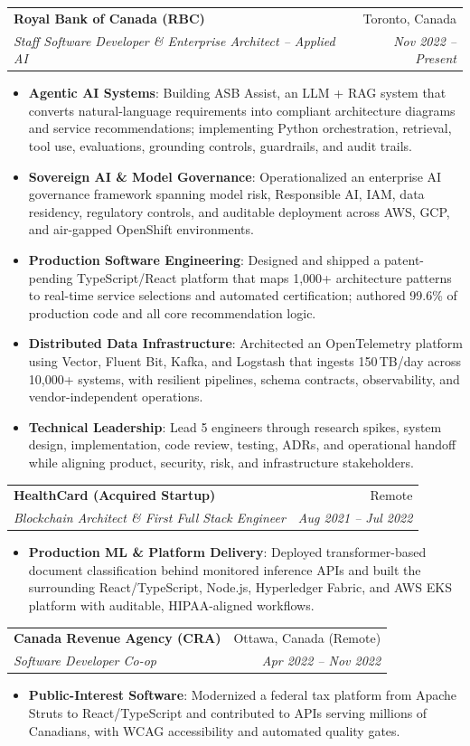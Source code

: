 \documentclass[letterpaper,9.5pt]{article}
\makeatletter
\newcommand{\resumeItem}[2]{\item\small{\textbf{#1}{: #2 \vspace{-2pt}}}}
\newcommand{\resumeSubheading}[4]{\vspace{-2pt}\item\begin{tabular*}{0.97\textwidth}{l@{\extracolsep{\fill}}r}\textbf{#1} & #2 \\\textit{\small#3} & \textit{\small #4} \\\end{tabular*}\vspace{-6pt}}
\newcommand{\resumeItemListStart}{\begin{itemize}}
\newcommand{\resumeItemListEnd}{\end{itemize}\vspace{-6pt}}
\makeatother
\begin{document}
  \resumeSubheading
    {Royal Bank of Canada (RBC)}{Toronto, Canada}
    {Staff Software Developer \& Enterprise Architect -- Applied AI}{Nov 2022 -- Present}
  \resumeItemListStart
    \resumeItem{Agentic AI Systems}
      {Building ASB Assist, an LLM + RAG system that converts natural-language requirements into compliant architecture diagrams and service recommendations; implementing Python orchestration, retrieval, tool use, evaluations, grounding controls, guardrails, and audit trails.}
    \resumeItem{Sovereign AI \& Model Governance}
      {Operationalized an enterprise AI governance framework spanning model risk, Responsible AI, IAM, data residency, regulatory controls, and auditable deployment across AWS, GCP, and air-gapped OpenShift environments.}
    \resumeItem{Production Software Engineering}
      {Designed and shipped a patent-pending TypeScript/React platform that maps 1,000+ architecture patterns to real-time service selections and automated certification; authored 99.6\% of production code and all core recommendation logic.}
    \resumeItem{Distributed Data Infrastructure}
      {Architected an OpenTelemetry platform using Vector, Fluent Bit, Kafka, and Logstash that ingests 150\,TB/day across 10,000+ systems, with resilient pipelines, schema contracts, observability, and vendor-independent operations.}
    \resumeItem{Technical Leadership}
      {Lead 5 engineers through research spikes, system design, implementation, code review, testing, ADRs, and operational handoff while aligning product, security, risk, and infrastructure stakeholders.}
  \resumeItemListEnd

  \resumeSubheading
    {HealthCard (Acquired Startup)}{Remote}
    {Blockchain Architect \& First Full Stack Engineer}{Aug 2021 -- Jul 2022}
  \resumeItemListStart
    \resumeItem{Production ML \& Platform Delivery}
      {Deployed transformer-based document classification behind monitored inference APIs and built the surrounding React/TypeScript, Node.js, Hyperledger Fabric, and AWS EKS platform with auditable, HIPAA-aligned workflows.}
  \resumeItemListEnd

  \resumeSubheading
    {Canada Revenue Agency (CRA)}{Ottawa, Canada (Remote)}
    {Software Developer Co-op}{Apr 2022 -- Nov 2022}
  \resumeItemListStart
    \resumeItem{Public-Interest Software}
      {Modernized a federal tax platform from Apache Struts to React/TypeScript and contributed to APIs serving millions of Canadians, with WCAG accessibility and automated quality gates.}
  \resumeItemListEnd
\end{document}
